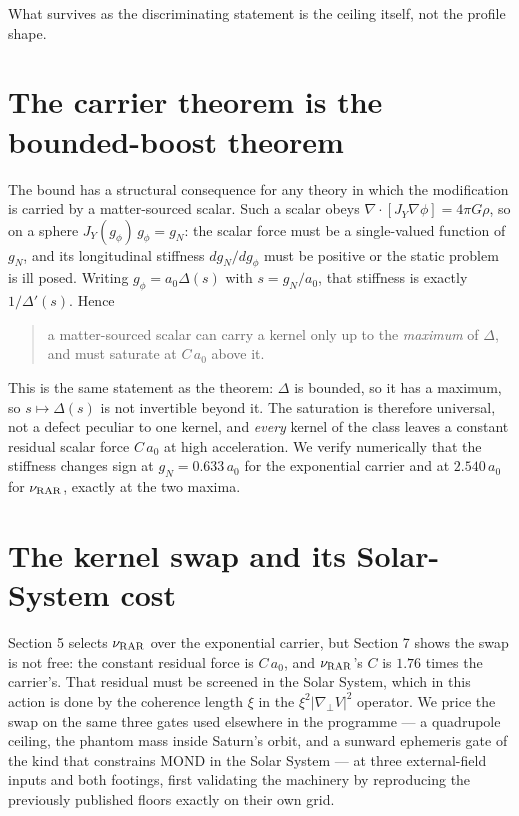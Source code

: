 \documentclass[11pt,letterpaper]{article}
\begin{document}
What survives as the discriminating statement is the ceiling itself, not the profile shape.

\section{The carrier theorem is the bounded-boost theorem}
The bound has a structural consequence for any theory in which the modification is carried by a matter-sourced scalar. Such a scalar obeys $\nabla\!\cdot\![J_Y\nabla\phi]=4\pi G\rho$, so on a sphere $J_Y(g_\phi)\,g_\phi=g_N$: the scalar force must be a single-valued function of $g_N$, and its longitudinal stiffness $dg_N/dg_\phi$ must be positive or the static problem is ill posed. Writing $g_\phi=a_0\Delta(s)$ with $s=g_N/a_0$, that stiffness is exactly $1/\Delta'(s)$. Hence
\begin{quote}
a matter-sourced scalar can carry a kernel only up to the \emph{maximum} of $\Delta$, and must saturate at $C\,a_0$ above it.
\end{quote}
This is the same statement as the theorem: $\Delta$ is bounded, so it has a maximum, so $s\mapsto\Delta(s)$ is not invertible beyond it. The saturation is therefore universal, not a defect peculiar to one kernel, and \emph{every} kernel of the class leaves a constant residual scalar force $C\,a_0$ at high acceleration. We verify numerically that the stiffness changes sign at $g_N=0.633\,a_0$ for the exponential carrier and at $2.540\,a_0$ for $\nu_{\rm RAR}$, exactly at the two maxima.

\section{The kernel swap and its Solar-System cost}
Section 5 selects $\nu_{\rm RAR}$ over the exponential carrier, but Section 7 shows the swap is not free: the constant residual force is $C\,a_0$, and $\nu_{\rm RAR}$'s $C$ is $1.76$ times the carrier's. That residual must be screened in the Solar System, which in this action is done by the coherence length $\xi$ in the $\xi^2|\nabla_\perp V|^2$ operator. We price the swap on the same three gates used elsewhere in the programme --- a quadrupole ceiling, the phantom mass inside Saturn's orbit, and a sunward ephemeris gate of the kind that constrains MOND in the Solar System \cite{hees14} --- at three external-field inputs and both footings, first validating the machinery by reproducing the previously published floors exactly on their own grid.
\end{document}
